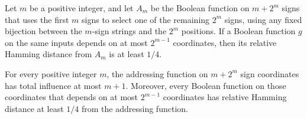 \begin{theorem}
\label{FABL.not_close_addressing_of_isKJunta}
\leanok
{}
Let $m$ be a positive integer, and let $A_m$ be the Boolean function on $m+2^m$ signs
that uses the first $m$ signs to select one of the remaining $2^m$ signs, using any
fixed bijection between the $m$-sign strings and the $2^m$ positions. If a Boolean
function $g$ on the same inputs depends on at most $2^{m-1}$ coordinates, then its
relative Hamming distance from $A_m$ is at least $1/4$.
\end{theorem}

\begin{theorem}
\label{FABL.exercise9_26_addressing_witness}
\leanok
{}
For every positive integer $m$, the addressing function on $m+2^m$ sign coordinates has
total influence at most $m+1$. Moreover, every Boolean function on those coordinates
that depends on at most $2^{m-1}$ coordinates has relative Hamming distance at least
$1/4$ from the addressing function.
\end{theorem}
